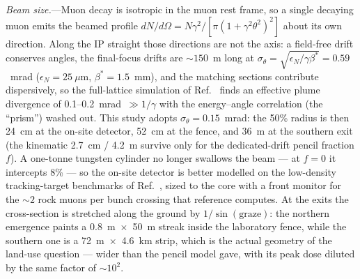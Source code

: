 \documentclass[aps,prl,reprint,superscriptaddress,nofootinbib]{revtex4-2}
\begin{document}
\emph{Beam size.}---Muon decay is isotropic in the muon rest frame, so a
single decaying muon emits the beamed profile
$dN/d\Omega = N\gamma^{2}/[\pi(1+\gamma^{2}\theta^{2})^{2}]$ about its own
direction. Along the IP straight those directions are not the axis: a
field-free drift conserves angles, the final-focus drifts are
${\sim}150$~m long at $\sigma_\theta = \sqrt{\epsilon_N/\gamma\beta^{*}}
= 0.59$~mrad ($\epsilon_N = 25~\mu$m, $\beta^{*} = 1.5$~mm), and the
matching sections contribute dispersively, so the full-lattice simulation
of Ref.~\cite{MINT} finds an effective plume divergence of
0.1--0.2~mrad~$\gg 1/\gamma$ with the energy--angle correlation (the
``prism'') washed out. This study adopts $\sigma_\theta = 0.15$~mrad: the
50\% radius is then 24~cm at the on-site detector, 52~cm at the fence,
and 36~m at the southern exit (the kinematic 2.7~cm / 4.2~m survive only
for the dedicated-drift pencil fraction $f$). A one-tonne tungsten
cylinder no longer swallows the beam --- at $f=0$ it intercepts 8\% ---
so the on-site detector is better modelled on the low-density
tracking-target benchmarks of Ref.~\cite{MINT}, sized to the core with a
front monitor for the ${\sim}2$ rock muons per bunch crossing that
reference computes. At the exits the cross-section is stretched along the
ground by $1/\sin(\mathrm{graze})$: the northern emergence paints a
0.8~m~$\times$~50~m streak inside the laboratory fence, while the
southern one is a 72~m~$\times$~4.6~km strip, which is the actual
geometry of the land-use question --- wider than the pencil model gave,
with its peak dose diluted by the same factor of ${\sim}10^{2}$.
\end{document}
